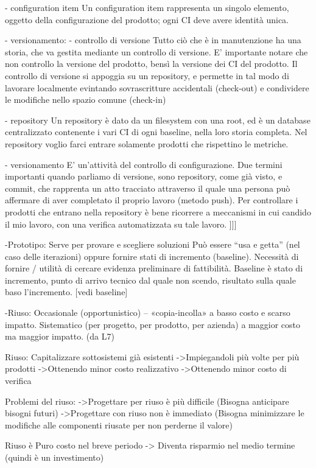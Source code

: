 \documentclass{report}
\begin{document}
- configuration item
Un configuration item rappresenta un singolo elemento, oggetto della configurazione del prodotto; ogni CI deve avere identità unica.

- versionamento:
- controllo di versione
Tutto ciò che è in manutenzione ha una storia, che va gestita mediante un controllo di versione. E' importante notare che non controllo la versione del prodotto, bensì la versione dei CI del prodotto.
Il controllo di versione si appoggia su un repository, e permette in tal modo di lavorare localmente evintando sovrascritture accidentali (check-out) e condividere le modifiche nello spazio comune (check-in)

- repository
Un repository è dato da un filesystem con una root, ed è un database centralizzato contenente i vari CI di ogni baseline, nella loro storia completa. Nel repository voglio farci entrare solamente prodotti che rispettino le metriche.

- versionamento
E' un'attività del controllo di configurazione.
Due termini importanti quando parliamo di versione, sono repository, come già visto, e commit, che rapprenta un atto tracciato attraverso il quale una persona può affermare di aver completato il proprio lavoro (metodo push). Per controllare i prodotti che entrano nella repository è bene ricorrere a meccanismi in cui candido il mio lavoro, con una verifica automatizzata su tale lavoro.
]]]

-Prototipo: 
Serve per provare e scegliere soluzioni Può essere “usa e getta” (nel caso delle iterazioni) oppure fornire stati di incremento (baseline). Necessità di fornire / utilità di cercare evidenza preliminare di fattibilità. Baseline è stato di incremento, punto di arrivo tecnico dal quale non scendo, risultato sulla quale baso l'incremento. [vedi baseline]

-Riuso: 
Occasionale (opportunistico) – «copia-incolla» a basso costo e scarso impatto. 
Sistematico (per progetto, per prodotto, per azienda) a maggior costo ma maggior impatto.
(da L7)

Riuso: 
Capitalizzare sottosistemi già esistenti
->Impiegandoli più volte per più prodotti
->Ottenendo minor costo realizzativo
->Ottenendo minor costo di verifica

Problemi del riuso:
->Progettare per riuso è più difficile (Bisogna anticipare bisogni futuri) 
->Progettare con riuso non è immediato (Bisogna minimizzare le modifiche alle componenti riusate per non perderne il valore)

Riuso è Puro costo nel breve periodo -> Diventa risparmio nel medio termine (quindi è un investimento) 
\end{document}
